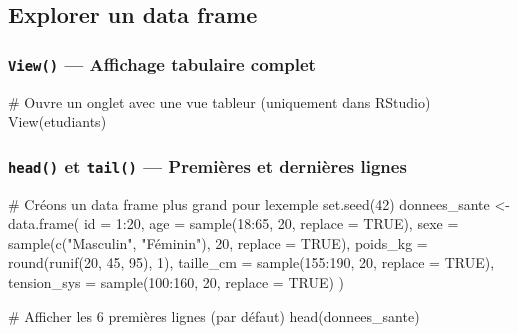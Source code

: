 \documentclass[
  french,
  11pt,
  a4paper,
]{article}
\newenvironment{Shaded}{}{}
\newcommand{\AttributeTok}[1]{\textcolor[rgb]{0.84,0.23,0.29}{#1}}
\newcommand{\CommentTok}[1]{\textcolor[rgb]{0.42,0.45,0.49}{#1}}
\newcommand{\ConstantTok}[1]{\textcolor[rgb]{0.00,0.36,0.77}{#1}}
\newcommand{\DecValTok}[1]{\textcolor[rgb]{0.00,0.36,0.77}{#1}}
\newcommand{\FunctionTok}[1]{\textcolor[rgb]{0.44,0.26,0.76}{#1}}
\newcommand{\NormalTok}[1]{\textcolor[rgb]{0.14,0.16,0.18}{#1}}
\newcommand{\OtherTok}[1]{\textcolor[rgb]{0.44,0.26,0.76}{#1}}
\newcommand{\SpecialCharTok}[1]{\textcolor[rgb]{0.00,0.36,0.77}{#1}}
\newcommand{\StringTok}[1]{\textcolor[rgb]{0.01,0.18,0.38}{#1}}
\begin{document}
\subsection{Explorer un data frame}\label{explorer-un-data-frame}

\subsubsection{\texorpdfstring{\texttt{View()} --- Affichage tabulaire
complet}{View() --- Affichage tabulaire complet}}\label{view-affichage-tabulaire-complet}

\begin{Shaded}
\begin{Highlighting}[]
\CommentTok{\# Ouvre un onglet avec une vue tableur (uniquement dans RStudio)}
\FunctionTok{View}\NormalTok{(etudiants)}
\end{Highlighting}
\end{Shaded}

\subsubsection{\texorpdfstring{\texttt{head()} et \texttt{tail()} ---
Premières et dernières
lignes}{head() et tail() --- Premières et dernières lignes}}\label{head-et-tail-premiuxe8res-et-derniuxe8res-lignes}

\begin{Shaded}
\begin{Highlighting}[]
\CommentTok{\# Créons un data frame plus grand pour l\textquotesingle{}exemple}
\FunctionTok{set.seed}\NormalTok{(}\DecValTok{42}\NormalTok{)}
\NormalTok{donnees\_sante }\OtherTok{\textless{}{-}} \FunctionTok{data.frame}\NormalTok{(}
  \AttributeTok{id =} \DecValTok{1}\SpecialCharTok{:}\DecValTok{20}\NormalTok{,}
  \AttributeTok{age =} \FunctionTok{sample}\NormalTok{(}\DecValTok{18}\SpecialCharTok{:}\DecValTok{65}\NormalTok{, }\DecValTok{20}\NormalTok{, }\AttributeTok{replace =} \ConstantTok{TRUE}\NormalTok{),}
  \AttributeTok{sexe =} \FunctionTok{sample}\NormalTok{(}\FunctionTok{c}\NormalTok{(}\StringTok{"Masculin"}\NormalTok{, }\StringTok{"Féminin"}\NormalTok{), }\DecValTok{20}\NormalTok{, }\AttributeTok{replace =} \ConstantTok{TRUE}\NormalTok{),}
  \AttributeTok{poids\_kg =} \FunctionTok{round}\NormalTok{(}\FunctionTok{runif}\NormalTok{(}\DecValTok{20}\NormalTok{, }\DecValTok{45}\NormalTok{, }\DecValTok{95}\NormalTok{), }\DecValTok{1}\NormalTok{),}
  \AttributeTok{taille\_cm =} \FunctionTok{sample}\NormalTok{(}\DecValTok{155}\SpecialCharTok{:}\DecValTok{190}\NormalTok{, }\DecValTok{20}\NormalTok{, }\AttributeTok{replace =} \ConstantTok{TRUE}\NormalTok{),}
  \AttributeTok{tension\_sys =} \FunctionTok{sample}\NormalTok{(}\DecValTok{100}\SpecialCharTok{:}\DecValTok{160}\NormalTok{, }\DecValTok{20}\NormalTok{, }\AttributeTok{replace =} \ConstantTok{TRUE}\NormalTok{)}
\NormalTok{)}

\CommentTok{\# Afficher les 6 premières lignes (par défaut)}
\FunctionTok{head}\NormalTok{(donnees\_sante)}
\end{Highlighting}
\end{Shaded}
\end{document}
